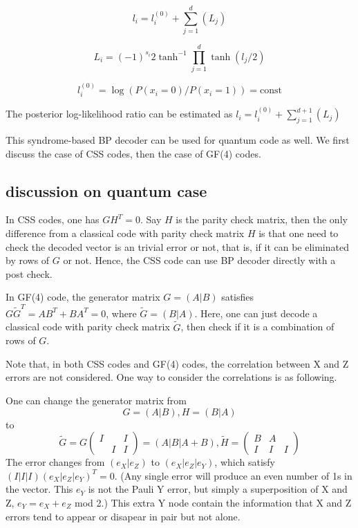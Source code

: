 \documentclass[aps,prb,12pt,tightenlines,%
notitlepage,longbibliography
]{revtex4-1}
\begin{document}
$$l_i=l_i^{(0)}+\sum_{j=1}^d (L_j)$$

$$L_i = (-1)^{s_i} 2 \tanh^{-1} \prod_{j=1}^d \tanh (l_j/2)$$

$$l_i^{(0)}=\log (P(x_i=0)/P(x_i=1)) = \text{const}$$

The posterior log-likelihood ratio can be estimated as
$l_i=l_i^{(0)}+\sum_{j=1}^{d+1} (L_j)$

This syndrome-based BP decoder can be used for quantum code as
well. We first discuss the case of CSS codes, then the case of GF(4)
codes.

\subsection{discussion on quantum case}

In CSS codes, one has $GH^T=0$. Say $H$ is the parity check matrix,
then the only difference from a classical code with parity check
matrix $H$ is that one need to check the decoded vector is an trivial
error or not, that is, if it can be eliminated
by rows of $G$ or not. Hence, the CSS code can use BP decoder directly
with a post check.

In GF(4) code, the generator matrix $G=(A|B)$ satisfies $G \tilde
G^T=AB^T+BA^T=0$, where $\tilde G=(B|A)$. Here, one can just decode a
classical code with parity check matrix $\tilde G$, then check if it
is a combination of rows of $G$.

Note that, in both CSS codes and GF(4) codes, the correlation between
X and Z errors are not considered. One way to consider the
correlations is as following.


One can change the
generator matrix from
$$G=(A|B), H=(B|A)$$
to
$$\tilde G =G \left( \begin{array}{ccc} I&&I\\&I&I \end{array}\right)
=(A|B|A+B), \tilde H = \left( \begin{array}{ccc} B & A \\
                                I&I&I \end{array} \right) $$
The error changes from $(e_X|e_Z)$ to $(e_X|e_Z|e_Y)$, which satisfy 
$(I|I|I)(e_X|e_Z|e_Y)^T=0 $. (Any single error will produce an
even number of 1s in the vector. This $e_Y$ is not the Pauli Y error,
but simply a superposition of X and Z, $e_Y=e_X+e_Z$ mod 2.) This
extra Y node contain the information that X and Z errors tend to
appear or disapear in pair but not alone.
\end{document}
